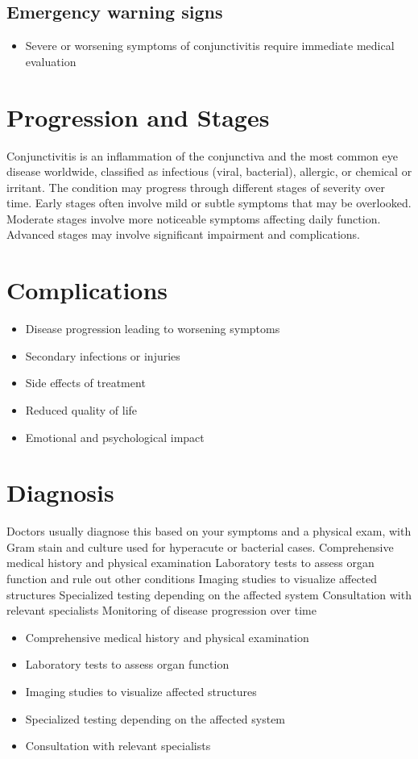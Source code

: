 \subsection{Emergency warning signs}
\begin{itemize}[noitemsep]
  \item Severe or worsening symptoms of conjunctivitis require immediate medical evaluation
\end{itemize}
\section{Progression and Stages}
Conjunctivitis is an inflammation of the conjunctiva and the most common eye disease worldwide, classified as infectious (viral, bacterial), allergic, or chemical or irritant. The condition may progress through different stages of severity over time. Early stages often involve mild or subtle symptoms that may be overlooked. Moderate stages involve more noticeable symptoms affecting daily function. Advanced stages may involve significant impairment and complications.
\section{Complications}
\begin{itemize}[noitemsep]
  \item Disease progression leading to worsening symptoms
  \item Secondary infections or injuries
  \item Side effects of treatment
  \item Reduced quality of life
  \item Emotional and psychological impact
\end{itemize}
\section{Diagnosis}
Doctors usually diagnose this based on your symptoms and a physical exam, with Gram stain and culture used for hyperacute or bacterial cases. Comprehensive medical history and physical examination Laboratory tests to assess organ function and rule out other conditions Imaging studies to visualize affected structures Specialized testing depending on the affected system Consultation with relevant specialists Monitoring of disease progression over time

\begin{itemize}[noitemsep]
  \item Comprehensive medical history and physical examination
  \item Laboratory tests to assess organ function
  \item Imaging studies to visualize affected structures
  \item Specialized testing depending on the affected system
  \item Consultation with relevant specialists
\end{itemize}

